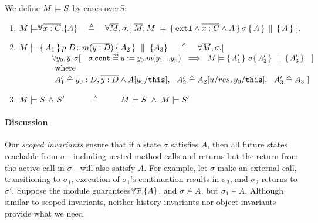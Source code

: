\begin{definition}  
We define $M \models {S}$ by cases over$S$: %

\label{def:necessity-semantics}

\begin{enumerate}
 \item
 $\satisfies{M}{\TwoStatesN {\overline {x:C}} {A}} \ \  \ \triangleq   \ \ \ {\forall   \Mtwo,  \sigma.[\ {\satAssertQuadruple  \Mtwo  M    {\extThis \wedge \overline {x:C} \wedge A} \sigma {A} {A} }\ ].}$
  \item
 $\satisfies{M} { \mprepostN {A_1}{p\ D}{m}{y}{D}{A_2} {A_3} }\  \ \ \   \triangleq    \ \ \ \forall   \Mtwo,  \sigma.[\ $    \\
$\strut  \ \ \   \ \ \ \ \ \ \ \ \   \   { \forall   y_0,\overline y, \sigma[ \ \ \ \sigma.\prg{cont}\txteq {u:=y_0.m(y_1,..y_n)} \ \ \Longrightarrow \ \ 
\satisfies  {M} {\quadruple  {A_1'} }   {\sigma}   {A_2' } {A_3' }  \  \ \  ]} $  \\
$\strut  \ \ \   \ \ \ \ \ \ \ \ \   \  \mbox{where}$\\
$\strut  \ \ \   \ \ \ \ \ \ \ \ \   \   A_1' \triangleq   y_0:D,{\overline {y:D}}   \wedge   A[y_0/\mbox{\normalfont{\texttt{this}}}],\  \  A_2' \triangleq A_2[u/res,y_0/\mbox{\normalfont{\texttt{this}}}],\ \ A_3' \triangleq A_3  \  ]$  
 \item
 $M \models S\, \wedge\, S'$\ \ \  \ \ \  $\triangleq$  \  \ \  \   $\satisfies{M}{S}\ \wedge \ \satisfies{M}{S'}$
\end{enumerate}
\end{definition}

\paragraph{Discussion} {Our \emph{scoped invariants} }  ensure that if a state $\sigma$ satisfies $A$, then all future states reachable from $\sigma$—including nested method calls and returns but   the return from the active call in $\sigma$—will also satisfy $A$. For example, let $\sigma$ make an external call, transitioning to $\sigma_1$,    execution of $\sigma_1$'s continuation results in $\sigma_2$, and $\sigma_2$ returns  to $\sigma'$. 
Suppose the module guarantees $\TwoStatesN {\overline{x}} {A}$, and $\sigma \not\models A$, but $\sigma_1 \models A$. 
{Although similar to scoped invariants, neither history invariants nor object invariants provide what we need.}

